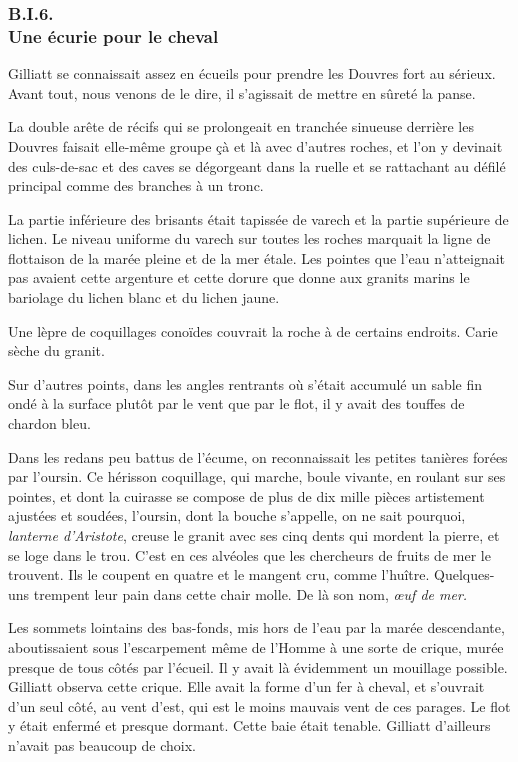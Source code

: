 \documentclass[french,twoside]{book} %
\begin{document}
 \subsubsection[{B.I.6. Une écurie pour le cheval}]{B.I.6. \\
Une écurie pour le cheval}
\noindent Gilliatt se connaissait assez en écueils pour prendre les Douvres fort au sérieux. Avant tout, nous venons de le dire, il s’agissait de mettre en sûreté la panse.\par
La double arête de récifs qui se prolongeait en tranchée sinueuse derrière les Douvres faisait elle-même groupe çà et là avec d’autres roches, et l’on y devinait des culs-de-sac et des caves se dégorgeant dans la ruelle et se rattachant au défilé principal comme des branches à un tronc.\par
La partie inférieure des brisants était tapissée de varech et la partie supérieure de lichen. Le niveau uniforme du varech sur toutes les roches marquait la ligne de flottaison de la marée pleine et de la mer étale. Les pointes que l’eau n’atteignait pas avaient cette argenture et cette dorure que donne aux granits marins le bariolage du lichen blanc et du lichen jaune.\par
Une lèpre de coquillages conoïdes couvrait la roche à de certains endroits. Carie sèche du granit.\par
 Sur d’autres points, dans les angles rentrants où s’était accumulé un sable fin ondé à la surface plutôt par le vent que par le flot, il y avait des touffes de chardon bleu.\par
Dans les redans peu battus de l’écume, on reconnaissait les petites tanières forées par l’oursin. Ce hérisson coquillage, qui marche, boule vivante, en roulant sur ses pointes, et dont la cuirasse se compose de plus de dix mille pièces artistement ajustées et soudées, l’oursin, dont la bouche s’appelle, on ne sait pourquoi, \emph{lanterne d’Aristote}, creuse le granit avec ses cinq dents qui mordent la pierre, et se loge dans le trou. C’est en ces alvéoles que les chercheurs de fruits de mer le trouvent. Ils le coupent en quatre et le mangent cru, comme l’huître. Quelques-uns trempent leur pain dans cette chair molle. De là son nom, \emph{œuf de mer.}\par
Les sommets lointains des bas-fonds, mis hors de l’eau par la marée descendante, aboutissaient sous l’escarpement même de l’Homme à une sorte de crique, murée presque de tous côtés par l’écueil. Il y avait là évidemment un mouillage possible. Gilliatt observa cette crique. Elle avait la forme d’un fer à cheval, et s’ouvrait d’un seul côté, au vent d’est, qui est le moins mauvais vent de ces parages. Le flot y était enfermé et presque dormant. Cette baie était tenable. Gilliatt d’ailleurs n’avait pas beaucoup de choix.\par
\end{document}
